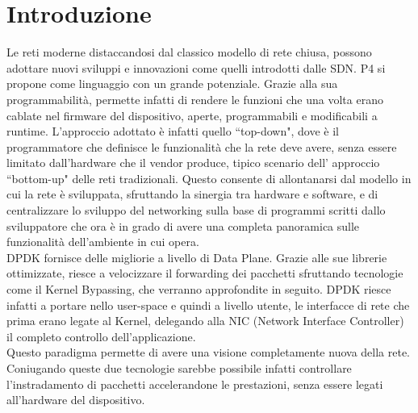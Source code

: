 \section*{Introduzione}


Le reti moderne distaccandosi dal classico modello di rete chiusa, possono adottare nuovi sviluppi e innovazioni come quelli introdotti dalle SDN.
P4 si propone come linguaggio con un grande potenziale. Grazie alla sua programmabilità, permette infatti di rendere le funzioni che una volta erano cablate nel firmware del dispositivo, aperte, programmabili e modificabili a runtime. L'approccio adottato è infatti quello ``top-down", dove è il programmatore che definisce le funzionalità che la rete deve avere, senza essere limitato dall'hardware che il vendor produce, tipico scenario dell' approccio ``bottom-up" delle reti tradizionali.
Questo consente di allontanarsi dal modello in cui la rete è sviluppata, sfruttando la sinergia tra hardware e software, e di centralizzare lo sviluppo del networking sulla base di programmi scritti dallo sviluppatore che ora è in grado di avere una completa panoramica sulle funzionalità dell'ambiente in cui opera.\\
DPDK fornisce delle migliorie a livello di Data Plane. Grazie alle sue librerie ottimizzate, riesce a velocizzare il forwarding dei pacchetti sfruttando tecnologie come il Kernel Bypassing, che verranno approfondite in seguito. DPDK riesce infatti a portare nello user-space e quindi a livello utente, le interfacce di rete che prima erano legate al Kernel, delegando alla NIC (Network Interface Controller) il completo controllo dell'applicazione.\\
Questo paradigma permette di avere una visione completamente nuova della rete. Coniugando queste due tecnologie sarebbe possibile infatti controllare l'instradamento di pacchetti accelerandone le prestazioni, senza essere legati all'hardware del dispositivo.

\newpage
